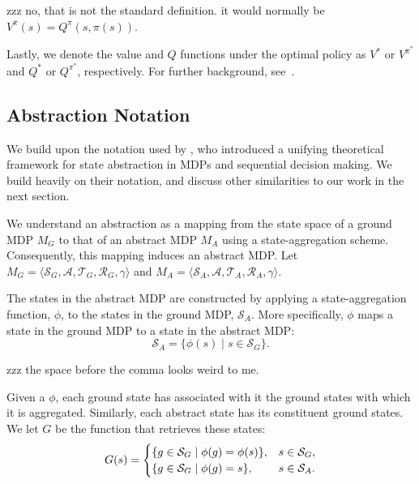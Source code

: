 zzz no, that is not the standard definition. it would normally be $V^\pi(s) = Q^\pi(s,\pi(s))$.

Lastly, we denote the value and $Q$ functions under the optimal policy as $V^*$ or $V^{\pi^*}$ and $Q^*$ or $Q^{\pi^*}$, respectively. For further background, see~.

\subsection{Abstraction Notation}
We build upon the notation used by , who introduced a unifying theoretical framework for state abstraction in \acp{MDP} and sequential decision making. We build heavily on their notation, and discuss other similarities to our work in the next section.

We understand an abstraction as a mapping from the state space of a ground MDP $M_G$ to that of an abstract MDP $M_A$ using a state-aggregation scheme. Consequently, this mapping induces an abstract MDP. Let $M_G = \langle \mathcal{S}_G, \mathcal{A}, \mathcal{T}_G, \mathcal{R}_G, \gamma \rangle$ and $M_A = \langle \mathcal{S}_A, \mathcal{A}, \mathcal{T}_A, \mathcal{R}_A, \gamma \rangle$.
\edefn

The states in the abstract \ac{MDP} are constructed by applying a state-aggregation function, $\phi$, to the states in the ground \ac{MDP}, $\mathcal{S}_A$. More specifically, $\phi$ maps a state in the ground \ac{MDP} to a state in the abstract \ac{MDP}:
\begin{equation}
\mathcal{S}_A = \{ \phi(s) \mid s \in \mathcal{S}_G\}.
\end{equation}
\edefn

zzz the space before the comma looks weird to me.

Given a $\phi$, each ground state has associated with it the ground states with which it is aggregated. Similarly, each abstract state has its constituent ground states. We let $G$ be the function that retrieves these states:
\begin{equation}
G(s)=
\begin{cases}
\{g \in \mathcal{S}_G \mid \phi(g) = \phi(s) \},& s \in \mathcal{S}_G,\\
\{g \in \mathcal{S}_G \mid \phi(g)=s \},& s \in \mathcal{S}_A.
\end{cases}
\end{equation}
\edefn

